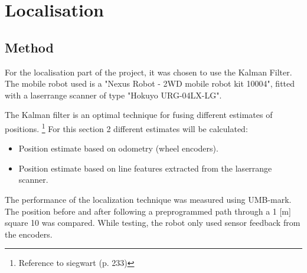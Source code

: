 \section{Localisation}
\subsection{Method}
For the localisation part of the project, it was chosen to use the Kalman Filter. The mobile robot used is a "Nexus Robot - 2WD mobile robot kit 10004", fitted with a laserrange scanner of type "Hokuyo URG-04LX-LG". 

The Kalman filter is an optimal technique for fusing different estimates of positions. \footnote{Reference to siegwart (p. 233)} For this section 2 different estimates will be calculated:

\begin{itemize}
	\item Position estimate based on odometry (wheel encoders).
	\item Position estimate based on line features extracted from the laserrange scanner. 
\end{itemize}


The performance of the localization technique was measured using UMB-mark. The position before and after following a preprogrammed path through a 1  [m] square 10 was compared. While testing, the robot only used sensor feedback from the encoders. 



